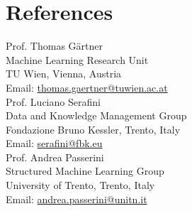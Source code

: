 \documentclass[10pt, a4paper]{article}
\newcommand{\years}[1]{\marginnote{\scriptsize #1}}
\begin{document}


\section*{References}
Prof. Thomas Gärtner\\
Machine Learning Research Unit\\
TU Wien, Vienna, Austria\\
Email: \href{mailto: thomas.gaertner@tuwien.ac.at}{thomas.gaertner@tuwien.ac.at} \\ 

Prof. Luciano Serafini \\
Data and Knowledge Management Group\\
Fondazione Bruno Kessler, Trento, Italy\\
Email: \href{mailto: serafini@fbk.eu}{serafini@fbk.eu} \\ 

Prof. Andrea Passerini \\
Structured Machine Learning Group\\
University of Trento, Trento, Italy \\ 
Email: \href{mailto: andrea.passerini@unitn.it}{andrea.passerini@unitn.it} \\ 
\end{document}
